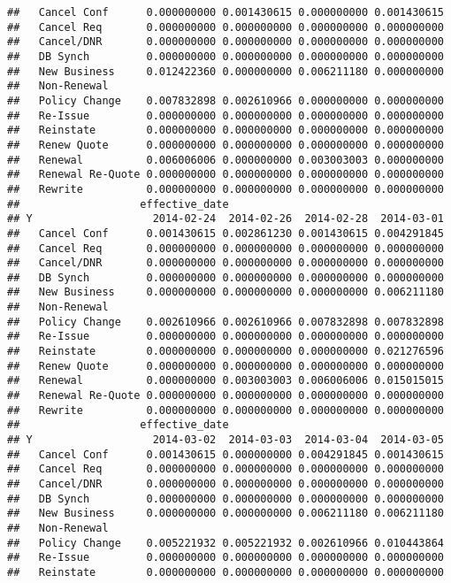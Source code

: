 \documentclass[]{article}
\begin{document}
\begin{verbatim}
##   Cancel Conf      0.000000000 0.001430615 0.000000000 0.001430615
##   Cancel Req       0.000000000 0.000000000 0.000000000 0.000000000
##   Cancel/DNR       0.000000000 0.000000000 0.000000000 0.000000000
##   DB Synch         0.000000000 0.000000000 0.000000000 0.000000000
##   New Business     0.012422360 0.000000000 0.006211180 0.000000000
##   Non-Renewal                                                     
##   Policy Change    0.007832898 0.002610966 0.000000000 0.000000000
##   Re-Issue         0.000000000 0.000000000 0.000000000 0.000000000
##   Reinstate        0.000000000 0.000000000 0.000000000 0.000000000
##   Renew Quote      0.000000000 0.000000000 0.000000000 0.000000000
##   Renewal          0.006006006 0.000000000 0.003003003 0.000000000
##   Renewal Re-Quote 0.000000000 0.000000000 0.000000000 0.000000000
##   Rewrite          0.000000000 0.000000000 0.000000000 0.000000000
##                   effective_date
## Y                   2014-02-24  2014-02-26  2014-02-28  2014-03-01
##   Cancel Conf      0.001430615 0.002861230 0.001430615 0.004291845
##   Cancel Req       0.000000000 0.000000000 0.000000000 0.000000000
##   Cancel/DNR       0.000000000 0.000000000 0.000000000 0.000000000
##   DB Synch         0.000000000 0.000000000 0.000000000 0.000000000
##   New Business     0.000000000 0.000000000 0.000000000 0.006211180
##   Non-Renewal                                                     
##   Policy Change    0.002610966 0.002610966 0.007832898 0.007832898
##   Re-Issue         0.000000000 0.000000000 0.000000000 0.000000000
##   Reinstate        0.000000000 0.000000000 0.000000000 0.021276596
##   Renew Quote      0.000000000 0.000000000 0.000000000 0.000000000
##   Renewal          0.000000000 0.003003003 0.006006006 0.015015015
##   Renewal Re-Quote 0.000000000 0.000000000 0.000000000 0.000000000
##   Rewrite          0.000000000 0.000000000 0.000000000 0.000000000
##                   effective_date
## Y                   2014-03-02  2014-03-03  2014-03-04  2014-03-05
##   Cancel Conf      0.001430615 0.000000000 0.004291845 0.001430615
##   Cancel Req       0.000000000 0.000000000 0.000000000 0.000000000
##   Cancel/DNR       0.000000000 0.000000000 0.000000000 0.000000000
##   DB Synch         0.000000000 0.000000000 0.000000000 0.000000000
##   New Business     0.000000000 0.000000000 0.006211180 0.006211180
##   Non-Renewal                                                     
##   Policy Change    0.005221932 0.005221932 0.002610966 0.010443864
##   Re-Issue         0.000000000 0.000000000 0.000000000 0.000000000
##   Reinstate        0.000000000 0.000000000 0.000000000 0.000000000

\end{verbatim}
\end{document}
